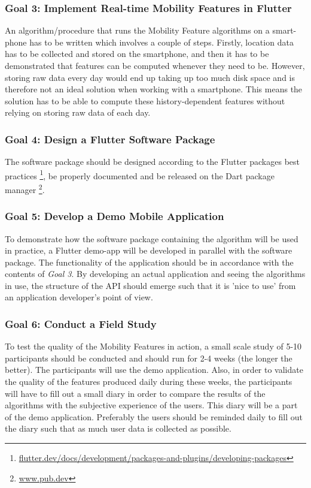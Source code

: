 \subsubsection*{Goal 3: Implement Real-time Mobility Features in Flutter}
An algorithm/procedure that runs the Mobility Feature algorithms on a smart-phone has to be written which involves a couple of steps. Firstly, location data has to be collected and stored on the smartphone, and then it has to be demonstrated that features can be computed whenever they need to be. However, storing raw data every day would end up taking up too much disk space and is therefore not an ideal solution when working with a smartphone. This means the solution has to be able to compute these history-dependent features without relying on storing raw data of each day.

\subsubsection*{Goal 4: Design a Flutter Software Package}
The software package should be designed according to the Flutter packages best practices \footnote{\url{flutter.dev/docs/development/packages-and-plugins/developing-packages}}, be properly documented and be released on the Dart package manager \footnote{\url{www.pub.dev}}.

\subsubsection*{Goal 5: Develop a Demo Mobile Application}
To demonstrate how the software package containing the algorithm will be used in practice, a Flutter demo-app will be developed in parallel with the software package. The functionality of the application should be in accordance with the contents of \textit{Goal 3}. By developing an actual application and seeing the algorithms in use, the structure of the API should emerge such that it is 'nice to use' from an application developer's point of view.

\subsubsection*{Goal 6: Conduct a Field Study}
To test the quality of the Mobility Features in action, a small scale study of 5-10 participants should be conducted and should run for 2-4 weeks (the longer the better). The participants will use the demo application. Also, in order to validate the quality of the features produced daily during these weeks, the participants will have to fill out a small diary in order to compare the results of the algorithms with the subjective experience of the users. This diary will be a part of the demo application. Preferably the users should be reminded daily to fill out the diary such that as much user data is collected as possible.

